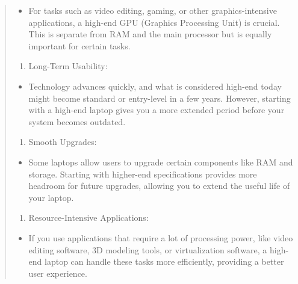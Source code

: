 \begin{leftbar}
\begin{quote}
\begin{itemize}
		\item
		      For tasks such as video editing, gaming, or other graphics-intensive applications, a high-end GPU (Graphics Processing Unit) is crucial. This is separate from RAM and the main processor but is equally important for certain tasks.
	\end{itemize}
	
	\begin{enumerate}[leftmargin=*]
		\def\labelenumi{\arabic{enumi}.}
		\setcounter{enumi}{3}
		
		\item
		      Long-Term Usability:
	\end{enumerate}
	
	\begin{itemize}
		
		\item
		      Technology advances quickly, and what is considered high-end today might become standard or entry-level in a few years. However, starting with a high-end laptop gives you a more extended period before your system becomes outdated.
	\end{itemize}
	
	\begin{enumerate}[leftmargin=*]
		\def\labelenumi{\arabic{enumi}.}
		\setcounter{enumi}{4}
		
		\item
		      Smooth Upgrades:
	\end{enumerate}
	
	\begin{itemize}
		
		\item
		      Some laptops allow users to upgrade certain components like RAM and storage. Starting with higher-end specifications provides more headroom for future upgrades, allowing you to extend the useful life of your laptop.
	\end{itemize}
	
	\begin{enumerate}[leftmargin=*]
		\def\labelenumi{\arabic{enumi}.}
		\setcounter{enumi}{5}
		
		\item
		      Resource-Intensive Applications:
	\end{enumerate}
	
	\begin{itemize}
		
		\item
		      If you use applications that require a lot of processing power, like video editing software, 3D modeling tools, or virtualization software, a high-end laptop can handle these tasks more efficiently, providing a better user experience.
	\end{itemize}
	

\end{quote}
\end{leftbar}
